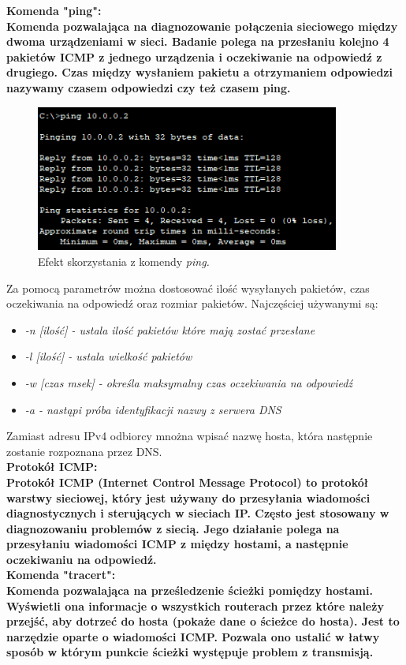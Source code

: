 \documentclass[a4paper,12pt]{article}
\newcommand{\h}[1]{\noindent \bf #1 \rm \\ \noindent}
\newcommand{\italic}[1]{\it #1 \rm}
\begin{document}
\h{Komenda "ping":}
Komenda pozwalająca na diagnozowanie połączenia sieciowego między dwoma urządzeniami w sieci. Badanie polega na przesłaniu kolejno 4 pakietów ICMP z jednego urządzenia i oczekiwanie na odpowiedź z drugiego. Czas między wysłaniem pakietu a otrzymaniem odpowiedzi nazywamy czasem odpowiedzi czy też czasem ping.
	
\begin{figure}[H]
	\centering
	\includegraphics[width=10cm]{fig2.png}
	\caption{Efekt skorzystania z komendy \it ping\rm.}
\end{figure}	

\noindent
Za pomocą parametrów można dostosować ilość wysyłanych pakietów, czas oczekiwania na odpowiedź oraz rozmiar pakietów. Najczęściej używanymi są:
\begin{itemize}
	\item \italic{-n [ilość]} - ustala ilość pakietów które mają zostać przesłane
	\item \italic{-l [ilość]} - ustala wielkość pakietów
	\item \italic{-w [czas msek]} - określa maksymalny czas oczekiwania na odpowiedź
	\item \italic{-a} - nastąpi próba identyfikacji nazwy z serwera DNS
\end{itemize}

\noindent
Zamiast adresu IPv4 odbiorcy mnożna wpisać nazwę hosta, która następnie zostanie rozpoznana przez DNS.\\

\h{Protokół ICMP:}
Protokół ICMP (Internet Control Message Protocol) to protokół warstwy sieciowej, który jest używany do przesyłania wiadomości diagnostycznych i sterujących w sieciach IP. Często jest stosowany w diagnozowaniu problemów z siecią. Jego działanie polega na przesyłaniu wiadomości ICMP z między hostami, a następnie oczekiwaniu na odpowiedź.\\

\h{Komenda "tracert":}
Komenda pozwalająca na prześledzenie ścieżki pomiędzy hostami. Wyświetli ona informacje o wszystkich routerach przez które należy przejść, aby dotrzeć do hosta (pokaże dane o ścieżce do hosta). Jest to narzędzie oparte o wiadomości ICMP. Pozwala ono ustalić w łatwy sposób w którym punkcie ścieżki występuje problem z transmisją.
\end{document}
